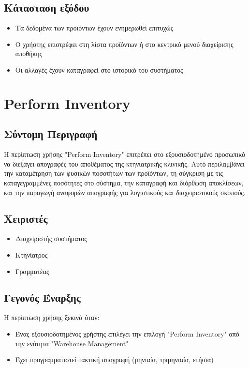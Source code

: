 \documentclass[12pt,a4paper,twoside]{book}
\begin{document}
\subsection{Κάτασταση εξόδου} %
\begin{itemize}
  \item Τα δεδομένα των προϊόντων έχουν ενημερωθεί επιτυχώς %
  \item Ο χρήστης επιστρέφει στη λίστα προϊόντων ή στο κεντρικό μενού διαχείρισης αποθήκης %
  \item Οι αλλαγές έχουν καταγραφεί στο ιστορικό του συστήματος
\end{itemize}

\section{Perform Inventory}

\subsection{Σύντομη Περιγραφή}
Η περίπτωση χρήσης "Perform Inventory" επιτρέπει στο εξουσιοδοτημένο προσωπικό να διεξάγει απογραφές του αποθέματος της κτηνιατρικής κλινικής. Αυτό περιλαμβάνει την καταμέτρηση των φυσικών ποσοτήτων των προϊόντων, τη σύγκριση με τις καταγεγραμμένες ποσότητες στο σύστημα, την καταγραφή και διόρθωση αποκλίσεων, και την παραγωγή αναφορών απογραφής για λογιστικούς και διαχειριστικούς σκοπούς. %

\subsection{Χειριστές}
\begin{itemize}
  \item Διαχειριστής συστήματος
  \item Κτηνίατρος
  \item Γραμματέας
\end{itemize}

\subsection{Γεγονός Έναρξης}
Η περίπτωση χρήσης ξεκινά όταν:
\begin{itemize}
  \item Ένας εξουσιοδοτημένος χρήστης επιλέγει την επιλογή "Perform Inventory" από την ενότητα "Warehouse Management" %
  \item Έχει προγραμματιστεί τακτική απογραφή (μηνιαία, τριμηνιαία, ετήσια)
\end{itemize}
\end{document}
